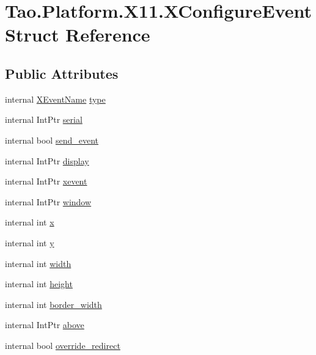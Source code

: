 \hypertarget{struct_tao_1_1_platform_1_1_x11_1_1_x_configure_event}{
\section{Tao.Platform.X11.XConfigureEvent Struct Reference}
\label{struct_tao_1_1_platform_1_1_x11_1_1_x_configure_event}
}
\subsection*{Public Attributes}
\begin{DoxyCompactItemize}
\item 
internal \hyperlink{namespace_tao_1_1_platform_1_1_x11_aff81ed5b8778e1ea8e872861dff9f146}{XEventName} \hyperlink{struct_tao_1_1_platform_1_1_x11_1_1_x_configure_event_a3060f09d3cd6503d0276dc9c0bce8f1e}{type}
\item 
internal IntPtr \hyperlink{struct_tao_1_1_platform_1_1_x11_1_1_x_configure_event_a271d25119df53a343032348038a62e31}{serial}
\item 
internal bool \hyperlink{struct_tao_1_1_platform_1_1_x11_1_1_x_configure_event_a901789bf5f29eec2d989ca6eacb15cb4}{send\_\-event}
\item 
internal IntPtr \hyperlink{struct_tao_1_1_platform_1_1_x11_1_1_x_configure_event_a8c146c266cb95e10e75174d2d83294cc}{display}
\item 
internal IntPtr \hyperlink{struct_tao_1_1_platform_1_1_x11_1_1_x_configure_event_acf377c89332e32c106409b5997079072}{xevent}
\item 
internal IntPtr \hyperlink{struct_tao_1_1_platform_1_1_x11_1_1_x_configure_event_add80f087c1c9ebfc759fd2f101a942e3}{window}
\item 
internal int \hyperlink{struct_tao_1_1_platform_1_1_x11_1_1_x_configure_event_a4d87d7baaacb82e41a8098994dfe7a93}{x}
\item 
internal int \hyperlink{struct_tao_1_1_platform_1_1_x11_1_1_x_configure_event_a7d5e528c2da9578ca8af17cd44eb0234}{y}
\item 
internal int \hyperlink{struct_tao_1_1_platform_1_1_x11_1_1_x_configure_event_a8e50d520907e74a116424b84f13e44fb}{width}
\item 
internal int \hyperlink{struct_tao_1_1_platform_1_1_x11_1_1_x_configure_event_af68970c4163eddd9f826bc85caf7f581}{height}
\item 
internal int \hyperlink{struct_tao_1_1_platform_1_1_x11_1_1_x_configure_event_a6c82ce201b6f45df08dae6b5fb1c3ba8}{border\_\-width}
\item 
internal IntPtr \hyperlink{struct_tao_1_1_platform_1_1_x11_1_1_x_configure_event_a28393620408ff1eafbf88a18810ef6bc}{above}
\item 
internal bool \hyperlink{struct_tao_1_1_platform_1_1_x11_1_1_x_configure_event_a53ecd1cf43d8f10f29ebb654731bf8b3}{override\_\-redirect}
\end{DoxyCompactItemize}


